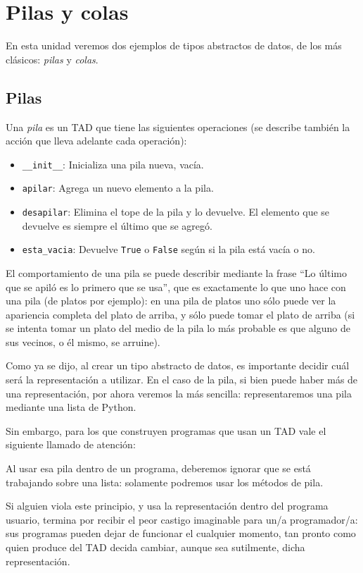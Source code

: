 \chapter{Pilas y colas}

En esta unidad veremos dos ejemplos de tipos abstractos de datos, de los más
clásicos: {\it pilas} y {\it colas}.

\section{Pilas}

Una {\it pila} es un TAD que tiene las siguientes operaciones (se describe también la acción que
lleva adelante cada operación):

\begin{itemize}
\item \lstinline+__init__+: Inicializa una pila nueva, vacía.

\item \lstinline!apilar!: Agrega un nuevo elemento a la pila.

\item \lstinline!desapilar!: Elimina el tope de la pila y lo devuelve.
El elemento que se devuelve es siempre el último que se agregó.

\item \lstinline!esta_vacia!: Devuelve \lstinline!True! o \lstinline!False!
según si la pila está vacía o no.

\end{itemize}

El comportamiento de una pila se puede describir mediante la frase
``Lo último que se apiló es lo primero que se usa'', que es exactamente lo que
uno hace con una pila (de platos por ejemplo): en una pila de platos uno sólo
puede ver la apariencia completa del plato de arriba, y sólo puede tomar el
plato de arriba (si se intenta tomar un plato del medio de la pila lo más
probable es que alguno de sus vecinos, o él mismo, se arruine).

Como ya se dijo, al crear un tipo abstracto de datos, es importante decidir
cuál será la representación a utilizar.  En el caso de la pila, si bien puede
haber más de una representación, por ahora veremos la más sencilla:
representaremos una pila mediante una lista de Python.

Sin embargo, para los que construyen programas que usan un TAD vale el
siguiente llamado de atención:

\begin{atencion}
Al usar esa pila dentro de un programa, deberemos ignorar que se está
trabajando sobre una lista: solamente podremos usar los métodos de pila.

Si alguien viola este principio, y usa la representación dentro del
programa usuario, termina por recibir el peor castigo imaginable para un/a
programador/a: sus programas pueden dejar de funcionar el cualquier
momento, tan pronto como quien produce del TAD decida cambiar, aunque sea
sutilmente, dicha representación.
\end{atencion}

